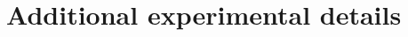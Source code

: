 \documentclass[11pt]{article}
\begin{document}
\setcounter{section}{1}


\clearpage
\appendix
\section{Additional experimental details}

\begingroup
\raggedright


\endgroup
\end{document}
